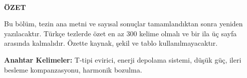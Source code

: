 \cleardoublepage
\thispagestyle{plain}
\begingroup
\singlespacing

\vspace*{72pt}
\begin{center}
  \bfseries\MakeUppercase{\TezBasligi}\\[18pt]
  ÖZET
\end{center}

Bu bölüm, tezin ana metni ve sayısal sonuçlar tamamlandıktan sonra yeniden yazılacaktır. Türkçe tezlerde özet en az 300 kelime olmalı ve bir ila üç sayfa arasında kalmalıdır. Özette kaynak, şekil ve tablo kullanılmayacaktır.

\textbf{Anahtar Kelimeler:} T-tipi evirici, enerji depolama sistemi, düşük güç, ileri besleme kompanzasyonu, harmonik bozulma.
\endgroup
